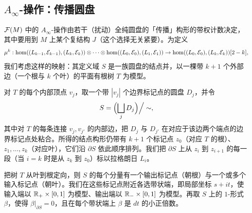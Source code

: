 \subsection{$A_\infty$-操作：传播圆盘}\label{ss:operations}

$\mathcal{F}(M)$ 中的 $A_\infty$-操作由若干（扰动）全纯圆盘的「传播」构形的带权计数决定，其中要用到 $M$ 上某个复结构 $J$（这个选择无关紧要）。为定义
\[
\mu^k:\hom((L_{k-1},\mathcal{E}_{k-1}),(L_k,\mathcal{E}_k))\otimes
\dots\otimes \hom((L_0,\mathcal{E}_0),(L_1,\mathcal{E}_1))\to
\hom((L_0,\mathcal{E}_0),(L_k,\mathcal{E}_k))[2-k],
\]
我们考虑这样的映射：其定义域 $S$ 是一族圆盘的结点并，以一棵带 $k+1$ 个外部边（一个根与 $k$ 个叶）的平面有根树 $T$ 为模型。

对 $T$ 的每个内部顶点 $v_j$，取一个带 $|v_j|$ 个边界标记点的圆盘 $D_j$，并令
\[
S=\Bigl(\bigsqcup_j D_j\Bigr)\Big/\sim,
\]
其中对 $T$ 的每条连接 $v_j,v_{j'}$ 的内部边，把 $D_j$ 与 $D_{j'}$ 在对应于该边两个端点的边界标记点处粘合。所得的结点构形仍带有 $k+1$ 个标记点 $z_0$（对应 $T$ 的根）、$z_1,\dots,z_k$（对应叶），它们沿 $\partial S$ 依此顺序排列。我们把 $\partial S$ 上从 $z_i$ 到 $z_{i+1}$ 的每一段（当 $i=k$ 时是从 $z_k$ 到 $z_0$）标以拉格朗日 $L_i$。

把树 $T$ 从叶到根定向，则 $S$ 的每个分量有一个输出标记点（朝根）与一个或多个输入标记点（朝叶）。我们在这些标记点附近各选带状端，即局部坐标 $s+it$，使输入端以 $\mathbb{R}_+\times[0,1]$ 为模型、输出端以 $\mathbb{R}_-\times[0,1]$ 为模型。再取 $S$ 上的 $1$-形式 $\beta$，使得 $\beta|_{\partial S}=0$，且在每个带状端上 $\beta$ 是 $dt$ 的小正倍数。

